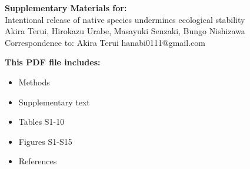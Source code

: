 \begin{center}
\LARGE{\textbf{Supplementary Materials for:}}\\[7.5mm]
\LARGE{Intentional release of native species undermines ecological stability}\\[7.5mm]
\large{Akira Terui, Hirokazu Urabe, Masayuki Senzaki, Bungo Nishizawa}\\[7.5mm]
\large{Correspondence to: Akira Terui hanabi0111@gmail.com}\\[15mm]\end{center}
\begin{flushleft}
\textbf{This PDF file includes:}
\begin{itemize}
\item Methods
\item Supplementary text
\item Tables S1-10
\item Figures S1-S15
\item References
\end{itemize}
\end{flushleft}

\newpage